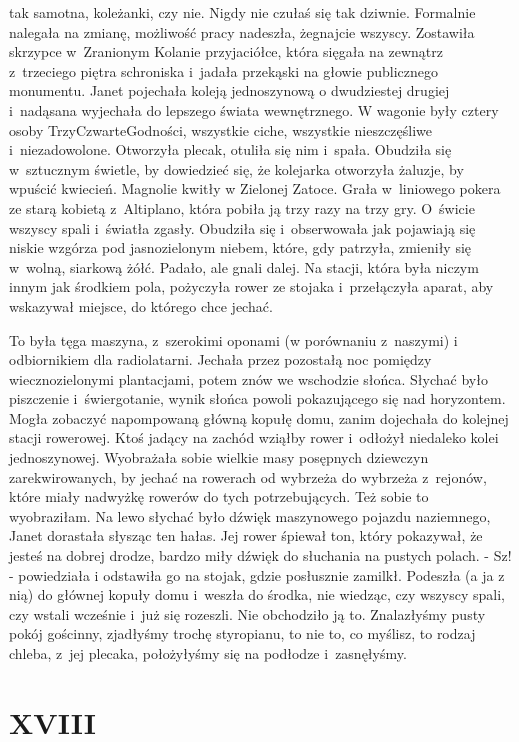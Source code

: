 \documentclass[oneside,polish,12pt,sfheadings]{mwbk}
\begin{document}
tak samotna, koleżanki, czy nie. Nigdy nie czułaś się tak dziwnie.
Formalnie nalegała na zmianę, możliwość pracy nadeszła, żegnajcie
wszyscy. Zostawiła skrzypce w~Zranionym Kolanie przyjaciółce, która
sięgała na zewnątrz z~trzeciego piętra schroniska i~jadała przekąski
na głowie publicznego monumentu. Janet pojechała koleją jednoszynową
o dwudziestej drugiej i~nadąsana wyjechała do lepszego świata wewnętrznego.
W wagonie były cztery osoby TrzyCzwarteGodności, wszystkie ciche,
wszystkie nieszczęśliwe i~niezadowolone. Otworzyła plecak, otuliła
się nim i~spała. Obudziła się w~sztucznym świetle, by dowiedzieć się,
że kolejarka otworzyła żaluzje, by wpuścić kwiecień. Magnolie kwitły
w Zielonej Zatoce. Grała w~liniowego pokera ze starą kobietą z~Altiplano,
która pobiła ją trzy razy na trzy gry. O~świcie wszyscy spali i~światła
zgasły. Obudziła się i~obserwowała jak pojawiają się niskie wzgórza
pod jasnozielonym niebem, które, gdy patrzyła, zmieniły się w~wolną,
siarkową żółć. Padało, ale gnali dalej. Na stacji, która była niczym
innym jak środkiem pola, pożyczyła rower ze stojaka i~przełączyła
aparat, aby wskazywał miejsce, do którego chce jechać.

To była tęga maszyna, z~szerokimi oponami (w porównaniu z~naszymi)
i odbiornikiem dla radiolatarni. Jechała przez pozostałą noc pomiędzy
wiecznozielonymi plantacjami, potem znów we wschodzie słońca. Słychać
było piszczenie i~świergotanie, wynik słońca powoli pokazującego się
nad horyzontem. Mogła zobaczyć napompowaną główną kopułę domu, zanim
dojechała do kolejnej stacji rowerowej. Ktoś jadący na zachód wziąłby
rower i~odłożył niedaleko kolei jednoszynowej. Wyobrażała sobie wielkie
masy posępnych dziewczyn zarekwirowanych, by jechać na rowerach od
wybrzeża do wybrzeża z~rejonów, które miały nadwyżkę rowerów do tych
potrzebujących. Też sobie to wyobraziłam. Na lewo słychać było dźwięk
maszynowego pojazdu naziemnego, Janet dorastała słysząc ten hałas.
Jej rower śpiewał ton, który pokazywał, że jesteś na dobrej drodze,
bardzo miły dźwięk do słuchania na pustych polach. - Sz! - powiedziała
i odstawiła go na stojak, gdzie posłusznie zamilkł. Podeszła (a ja
z nią) do głównej kopuły domu i~weszła do środka, nie wiedząc, czy
wszyscy spali, czy wstali wcześnie i~już się rozeszli. Nie obchodziło
ją to. Znalazłyśmy pusty pokój gościnny, zjadłyśmy trochę styropianu,
to nie to, co myślisz, to rodzaj chleba, z~jej plecaka, położyłyśmy
się na podłodze i~zasnęłyśmy.

\chapter{XVIII}
\end{document}
